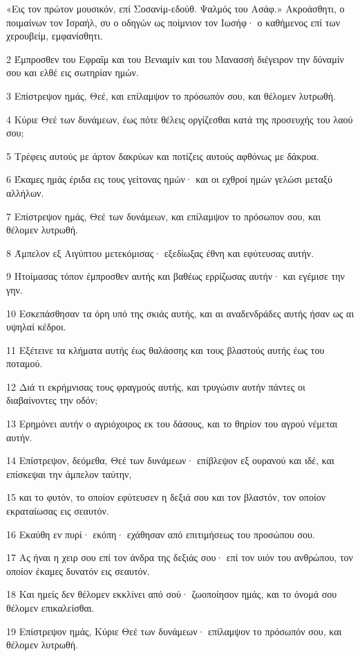 \par «Εις τον πρώτον μουσικόν, επί Σοσανίμ-εδούθ. Ψαλμός του Ασάφ.» Ακροάσθητι, ο ποιμαίνων τον Ισραήλ, συ ο οδηγών ως ποίμνιον τον Ιωσήφ· ο καθήμενος επί των χερουβείμ, εμφανίσθητι.
\par 2 Έμπροσθεν του Εφραΐμ και του Βενιαμίν και του Μανασσή διέγειρον την δύναμίν σου και ελθέ εις σωτηρίαν ημών.
\par 3 Επίστρεψον ημάς, Θεέ, και επίλαμψον το πρόσωπόν σου, και θέλομεν λυτρωθή.
\par 4 Κύριε Θεέ των δυνάμεων, έως πότε θέλεις οργίζεσθαι κατά της προσευχής του λαού σου;
\par 5 Τρέφεις αυτούς με άρτον δακρύων και ποτίζεις αυτούς αφθόνως με δάκρυα.
\par 6 Έκαμες ημάς έριδα εις τους γείτονας ημών· και οι εχθροί ημών γελώσι μεταξύ αλλήλων.
\par 7 Επίστρεψον ημάς, Θεέ των δυνάμεων, και επίλαμψον το πρόσωπον σου, και θέλομεν λυτρωθή.
\par 8 Άμπελον εξ Αιγύπτου μετεκόμισας· εξεδίωξας έθνη και εφύτευσας αυτήν.
\par 9 Ητοίμασας τόπον έμπροσθεν αυτής και βαθέως ερρίζωσας αυτήν· και εγέμισε την γην.
\par 10 Εσκεπάσθησαν τα όρη υπό της σκιάς αυτής, και αι αναδενδράδες αυτής ήσαν ως αι υψηλαί κέδροι.
\par 11 Εξέτεινε τα κλήματα αυτής έως θαλάσσης και τους βλαστούς αυτής έως του ποταμού.
\par 12 Διά τι εκρήμνισας τους φραγμούς αυτής, και τρυγώσιν αυτήν πάντες οι διαβαίνοντες την οδόν;
\par 13 Ερημόνει αυτήν ο αγριόχοιρος εκ του δάσους, και το θηρίον του αγρού νέμεται αυτήν.
\par 14 Επίστρεψον, δεόμεθα, Θεέ των δυνάμεων· επίβλεψον εξ ουρανού και ιδέ, και επίσκεψαι την άμπελον ταύτην,
\par 15 και το φυτόν, το οποίον εφύτευσεν η δεξιά σου και τον βλαστόν, τον οποίον εκραταίωσας εις σεαυτόν.
\par 16 Εκαύθη εν πυρί· εκόπη· εχάθησαν από επιτιμήσεως του προσώπου σου.
\par 17 Ας ήναι η χειρ σου επί τον άνδρα της δεξιάς σου· επί τον υιόν του ανθρώπου, τον οποίον έκαμες δυνατόν εις σεαυτόν.
\par 18 Και ημείς δεν θέλομεν εκκλίνει από σού· ζωοποίησον ημάς, και το όνομά σου θέλομεν επικαλείσθαι.
\par 19 Επίστρεψον ημάς, Κύριε Θεέ των δυνάμεων· επίλαμψον το πρόσωπόν σου, και θέλομεν λυτρωθή.

